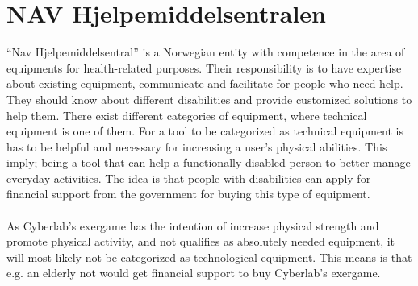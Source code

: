 \section{NAV Hjelpemiddelsentralen}
“Nav Hjelpemiddelsentral” is a Norwegian entity with competence in the area of equipments for health-related purposes. Their responsibility is to have expertise about existing equipment, communicate and facilitate for people who need help. They should know about different disabilities and provide customized solutions to help them. There exist different categories of equipment, where technical equipment is one of them. For a tool to be categorized as technical equipment is has to be helpful and necessary for increasing a user’s physical abilities. This imply; being a tool that can help a functionally disabled person to better manage everyday activities. The idea is that people with disabilities can apply for financial support from the government for buying this type of equipment.\\ \\
As Cyberlab’s exergame has the intention of increase physical strength and promote physical activity, and not qualifies as absolutely needed equipment, it will most likely not be categorized as technological equipment. This means is that e.g. an elderly not would get financial support to buy Cyberlab’s exergame.

